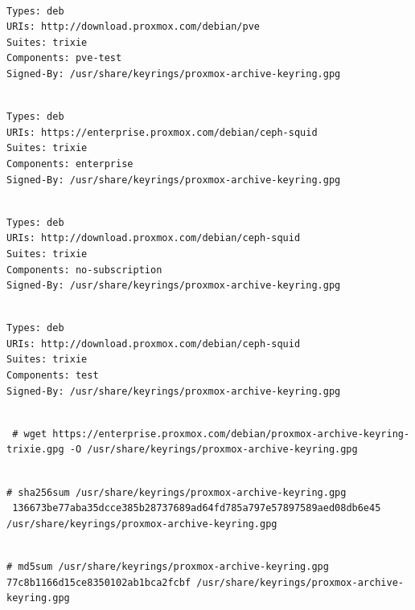\begin{lstlisting}

Types: deb
URIs: http://download.proxmox.com/debian/pve
Suites: trixie
Components: pve-test
Signed-By: /usr/share/keyrings/proxmox-archive-keyring.gpg

\end{lstlisting}

\begin{lstlisting}

Types: deb
URIs: https://enterprise.proxmox.com/debian/ceph-squid
Suites: trixie
Components: enterprise
Signed-By: /usr/share/keyrings/proxmox-archive-keyring.gpg

\end{lstlisting}

\begin{lstlisting}

Types: deb
URIs: http://download.proxmox.com/debian/ceph-squid
Suites: trixie
Components: no-subscription
Signed-By: /usr/share/keyrings/proxmox-archive-keyring.gpg

\end{lstlisting}

\begin{lstlisting}

Types: deb
URIs: http://download.proxmox.com/debian/ceph-squid
Suites: trixie
Components: test
Signed-By: /usr/share/keyrings/proxmox-archive-keyring.gpg

\end{lstlisting}

\begin{lstlisting}

 # wget https://enterprise.proxmox.com/debian/proxmox-archive-keyring-trixie.gpg -O /usr/share/keyrings/proxmox-archive-keyring.gpg

\end{lstlisting}

\begin{lstlisting}

# sha256sum /usr/share/keyrings/proxmox-archive-keyring.gpg
 136673be77aba35dcce385b28737689ad64fd785a797e57897589aed08db6e45 /usr/share/keyrings/proxmox-archive-keyring.gpg

\end{lstlisting}

\begin{lstlisting}

# md5sum /usr/share/keyrings/proxmox-archive-keyring.gpg
77c8b1166d15ce8350102ab1bca2fcbf /usr/share/keyrings/proxmox-archive-keyring.gpg

\end{lstlisting}

